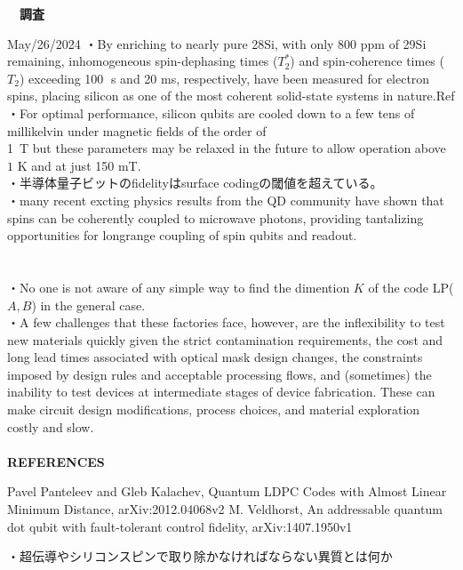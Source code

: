 \documentclass[a4paper,10.5pt]{ltjsarticle}
\begin{document}
\centerline
{\huge \bfseries　調査}
\rightline
{May/26/2024}
\leftline
{}
・By enriching to nearly pure 28Si, with only 800 ppm
of 29Si remaining, inhomogeneous spin-dephasing times ($T_2^*$) and spin-coherence times ($T_2$) exceeding 100 s and 20 ms, respectively, have been measured for electron spins, placing silicon as one of the most coherent solid-state systems in nature.Ref\cite{2}\\
・For optimal performance, silicon qubits are cooled down to a few tens of millikelvin under magnetic fields of the order of \\1\ T but these parameters may be relaxed in the future to allow operation above $1$ K and at just 150 mT.\\
・半導体量子ビットのfidelityはsurface codingの閾値を超えている。\\
・many recent excting physics results from the QD community have shown that spins can be coherently coupled to microwave photons, providing tantalizing opportunities for longrange coupling of spin qubits and readout.\\
\\
\\
・No one is not aware of any simple way to find the dimention $K$ of the code LP($A,B$) in the general case.\\
・A few challenges that these factories face, however, are the inflexibility to test new materials quickly given the strict contamination requirements, the cost and long lead times associated with optical mask design changes, the constraints imposed by design rules and acceptable processing flows, and (sometimes) the inability to test devices at intermediate stages of device fabrication. These can make circuit design modifications, process choices, and material exploration costly and slow.\\
\\
{\Large \bfseries REFERENCES}
\begin{thebibliography}{1}
\vspace{-1.5cm}
   Pavel Panteleev and Gleb Kalachev, Quantum LDPC Codes with Almost Linear
Minimum Distance, arXiv:2012.04068v2
   M. Veldhorst, An addressable quantum dot qubit with fault-tolerant control fidelity, arXiv:1407.1950v1

\end{thebibliography}
\vspace{50pt}
・超伝導やシリコンスピンで取り除かなければならない異質とは何か\\
\end{document}
